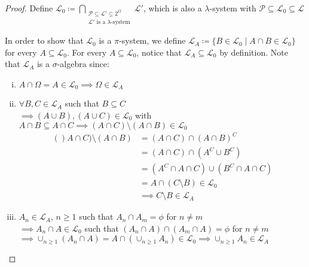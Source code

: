 \begin{proof}
	Define $\displaystyle \mathcal L_0 \coloneqq \bigcap_{\substack{\mathcal P \subseteq \mathcal L' \subseteq 2^\Omega \\ \mathcal L' \text{ is a $\lambda$-system}}} \mathcal L'$, which is also a $\lambda$-system with $\mathcal P \subseteq \mathcal L_0 \subseteq \mathcal L$
	\vspace{10pt}
	
	In order to show that $\mathcal L_0$ is a $\pi$-system, we define $\mathcal L_A \coloneqq \{B \in \mathcal L_0 \mid A \cap B \in \mathcal L_0\}$ for every $A \subseteq \mathcal L_0$. For every $A \subseteq \mathcal L_0$, notice that $\mathcal L_A \subseteq \mathcal L_0$ by definition. Note that $\mathcal L_A$ is a $\sigma$-algebra since:
	\begin{enumerate}[i)]
		\item $A \cap \Omega=A \in \mathcal L_0 \implies \Omega \in \mathcal L_A$
		\item $\forall B,C \in \mathcal L_A$ such that $B \subseteq C$ \\
		$\implies	(A \cup B),(A \cup C) \in \mathcal L_0$ with $A \cap B \subseteq A \cap C \implies (A \cap C)\setminus (A \cap B) \in \mathcal L_0$
		\begin{align*}
			()A \cap C)\setminus (A \cap B) &= (A \cap C) \cap (A \cap B)^C \\
			&= (A \cap C) \cap (A^C \cup B^C) \\
			&= (A^C \cap A \cap C) \cup (B^C \cap A \cap C) \\
			&= A \cap (C \setminus B) \in \mathcal L_0 \\
			&\implies C\setminus B \in \mathcal L_A
		\end{align*}
		\item $A_n \in \mathcal L_A$, $n \geq 1$ such that $A_n \cap A_m = \phi$ for $n \neq m$ \\
		$\implies A_n \cap A \in \mathcal L_0$ such that $(A_n \cap A) \cap (A_m \cap A) = \phi$ for $n \neq m$ \\
		$\implies \cup_{n \geq 1} (A_n \cap A) = A \cap (\cup_{n \geq 1} A_n) \in \mathcal L_0 \implies \cup_{n \geq 1} A_n \in \mathcal L_A$
	\end{enumerate}
	

\end{proof}
